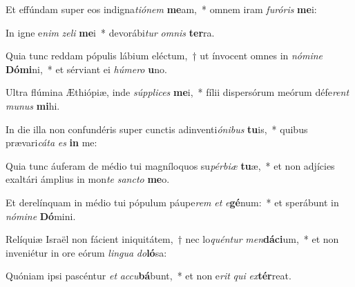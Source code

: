 \item Et effúndam super eos indigna\textit{ti}\textit{ó}\textit{nem} \textbf{me}am,~* omnem iram \textit{fu}\textit{ró}\textit{ris} \textbf{me}i:
\item In igne e\textit{nim} \textit{ze}\textit{li} \textbf{me}i~* devorábi\textit{tur} \textit{om}\textit{nis} \textbf{ter}ra.
\item Quia tunc reddam pópulis lábium eléctum,~† ut ínvocent omnes in \textit{nó}\textit{mi}\textit{ne} \textbf{Dó}\textbf{mi}ni,~* et sérviant ei \textit{hú}\textit{me}\textit{ro} \textbf{u}no.
\item Ultra flúmina Æthiópiæ, inde \textit{súp}\textit{pli}\textit{ces} \textbf{me}i,~* fílii dispersórum meórum défe\textit{rent} \textit{mu}\textit{nus} \textbf{mi}hi.
\item In die illa non confundéris super cunctis adinventi\textit{ó}\textit{ni}\textit{bus} \textbf{tu}is,~* quibus prævari\textit{cá}\textit{ta} \textit{es} \textbf{in} me:
\item Quia tunc áuferam de médio tui magníloquos su\textit{pér}\textit{bi}\textit{æ} \textbf{tu}æ,~* et non adjícies exaltári ámplius in mon\textit{te} \textit{sanc}\textit{to} \textbf{me}o.
\item Et derelínquam in médio tui pópulum páupe\textit{rem} \textit{et} \textit{e}\textbf{gé}num:~* et sperábunt in \textit{nó}\textit{mi}\textit{ne} \textbf{Dó}mini.
\item Relíquiæ Israël non fácient iniquitátem,~† nec lo\textit{quén}\textit{tur} \textit{men}\textbf{dá}\textbf{ci}um,~* et non inveniétur in ore eórum \textit{lin}\textit{gua} \textit{do}\textbf{ló}sa:
\item Quóniam ipsi pascéntur \textit{et} \textit{ac}\textit{cu}\textbf{bá}bunt,~* et non e\textit{rit} \textit{qui} \textit{ex}\textbf{tér}reat.
